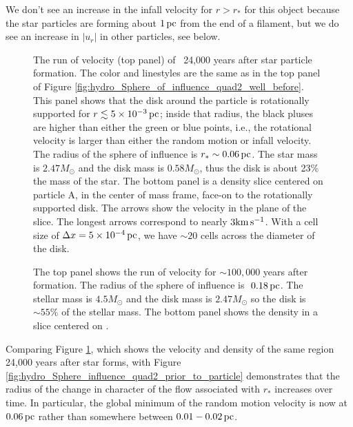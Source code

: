 \documentclass[../dissertation.tex]{subfiles}
\begin{document}
We don't see an increase in the infall velocity for $r > r_*$ for 
this object because the star particles are forming about $1 \,\rm pc$ from 
the end of a filament, but we do see an increase in $|u_r|$ in other 
particles, see below.
%
\begin{figure}[htb] %
\caption[Hydro Sphere of Infuence 3]{\label{fig:hydro_Sphere_influence_quad2_just_after}The run of velocity (top panel) of \partA\ 24,000 years after 
star particle formation.
The color and linestyles are the same as in the top panel of Figure \ref{fig:hydro_Sphere_of_influence_quad2_well_before}.
This panel shows that the disk around the particle is rotationally supported for $r\lesssim 5\times10^{-3}\,\rm pc$; inside that radius, 
the black pluses are higher than either the green or blue points, i.e., the rotational velocity is larger than either the random motion%
or infall velocity.
The radius of the sphere of influence is $r_*\sim 0.06 \,\rm pc$.
The star mass is $2.47 M_\odot$ and the disk mass is $0.58 M_\odot$, 
thus the disk is about 23\% the mass of the star.
The bottom panel is a density slice centered on particle A, in the center of mass frame, face-on to the rotationally supported disk. 
The arrows show the velocity in the plane of the slice. 
The longest arrows correspond to nearly $3 {\rm km \, s^{-1}}$.
With a cell size of $\Delta x=5\times10^{-4}\,\rm pc$, we have $\sim 20$ cells across the diameter of the disk.
}

\end{figure}
%
\begin{figure}[htb] %
\caption[Hydro Sphere of Influence Other]{\label{fig:hydro_Sphere_influence_quad2_end_time}The top panel shows the run of velocity for \partB $\sim 100,000$ years after formation.  The radius of the sphere of influence is $~0.18 \,\rm pc$.  The stellar mass is $4.5 M_\odot$ and the disk mass is $2.47 M_\odot$ so the disk is $\sim 55\%$ of the
stellar mass. The bottom panel shows the density in a slice centered on \partB.}
\end{figure}
%

Comparing Figure \ref{fig:hydro_Sphere_influence_quad2_just_after}, which shows 
the velocity and density of the same region 24,000 years after star 
\partA forms, with Figure \ref{fig:hydro_Sphere_influence_quad2_prior_to_particle} 
demonstrates that the radius of the change in character of the flow 
associated with $r_*$ increases over time. In particular, the global minimum 
of the random motion %
velocity is now at $0.06 \,\rm pc$ rather than somewhere 
between $0.01-0.02 \,\rm pc$.
\end{document}
